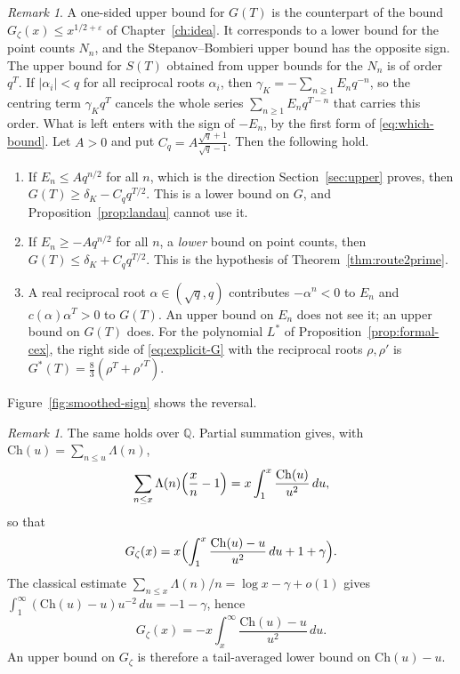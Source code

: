 \documentclass[11pt]{amsbook}
\theoremstyle{plain}
\theoremstyle{definition}
\theoremstyle{remark}
\newtheorem{remark}[theorem]{Remark}
\numberwithin{equation}{section}
\numberwithin{figure}{chapter}
\numberwithin{table}{chapter}
\newcommand{\Q}{\mathbb{Q}}
\newcommand{\Ch}{\mathrm{Ch}}
\newcommand{\Gz}{G_{\zeta}}
\begin{document}
\begin{remark}\label{rem:smoothed-sign}
A one-sided upper bound for $G(T)$ is the counterpart of the bound
$\Gz(x)\le x^{1/2+\varepsilon}$ of Chapter~\ref{ch:idea}. It
corresponds to a lower bound for the point counts $N_n$, and the
Stepanov--Bombieri upper bound has the opposite sign. The upper
bound for $S(T)$ obtained from upper bounds for the $N_n$ is of
order $q^T$. If $\lvert\alpha_i\rvert<q$ for all reciprocal roots
$\alpha_i$, then
$\gamma_K=-\sum_{n\ge1}E_nq^{-n}$, so the centring term
$\gamma_Kq^T$ cancels the whole series
$\sum_{n\ge1}E_nq^{T-n}$ that carries this order. What is left
enters with the sign of $-E_n$, by the first form of
\eqref{eq:which-bound}. Let $A>0$ and put
$C_q=A\frac{\sqrt q+1}{\sqrt q-1}$.
Then the following hold.
\begin{enumerate}
\item If $E_n\le Aq^{n/2}$ for all $n$, which is the direction
Section~\ref{sec:upper} proves, then
$G(T)\ge\delta_K-C_qq^{T/2}$. This is a lower bound on $G$, and
Proposition~\ref{prop:landau} cannot use it.
\item If $E_n\ge-Aq^{n/2}$ for all $n$, a \emph{lower} bound on
point counts, then $G(T)\le\delta_K+C_qq^{T/2}$. This is the
hypothesis of Theorem~\ref{thm:route2prime}.
\item A real reciprocal root $\alpha\in(\sqrt q,q)$ contributes
$-\alpha^n<0$ to $E_n$ and $c(\alpha)\alpha^T>0$ to $G(T)$. An
upper bound on $E_n$ does not see it; an upper bound on $G(T)$
does. For the polynomial $L^*$ of
Proposition~\ref{prop:formal-cex}, the right side of
\eqref{eq:explicit-G} with the reciprocal roots $\rho,\rho'$ is
$G^*(T)=\frac83(\rho^T+\rho'^T)$.
\end{enumerate}
Figure~\ref{fig:smoothed-sign} shows the reversal.
\end{remark}

\begin{remark}\label{rem:G-over-Q}
The same holds over $\Q$. Partial summation gives, with
$\Ch(u)=\sum_{n\le u}\Lambda(n)$,
\[
\sum_{n\le x}\Lambda(n)\Bigl(\frac xn-1\Bigr)
=x\int_1^x\frac{\Ch(u)}{u^2}\,du,
\]
so that
\[
\Gz(x)=x\Bigl(\int_1^x\frac{\Ch(u)-u}{u^2}\,du+1+\gamma\Bigr).
\]
The classical estimate
$\sum_{n\le x}\Lambda(n)/n=\log x-\gamma+o(1)$ gives
$\int_1^\infty(\Ch(u)-u)u^{-2}\,du=-1-\gamma$, hence
\[
\Gz(x)=-x\int_x^\infty\frac{\Ch(u)-u}{u^2}\,du.
\]
An upper bound on $\Gz$ is therefore a tail-averaged lower bound on
$\Ch(u)-u$.
\end{remark}
\end{document}
